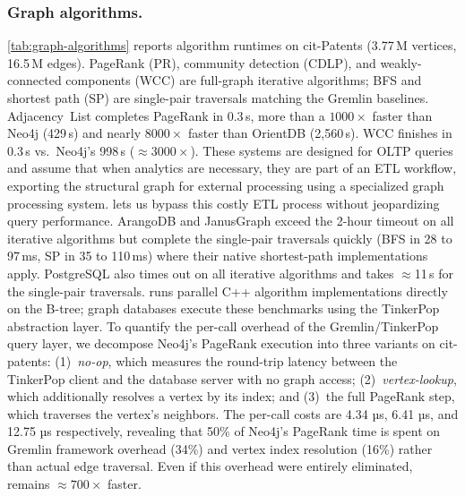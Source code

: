 \subsubsection{Graph algorithms.}
\label{sec:eval:property-graphalytics}
\autoref{tab:graph-algorithms} reports algorithm runtimes on cit-Patents (3.77\,M vertices, 16.5\,M edges).
PageRank (PR), community detection (CDLP), and weakly-connected components (WCC) are full-graph iterative algorithms; BFS and shortest path (SP) are single-pair traversals matching the Gremlin baselines.
\project{} Adjacency~List completes PageRank in 0.3\,s, more than a $1000\times$ faster than Neo4j (429\,s) and nearly $8000\times$ faster than OrientDB (2{,}560\,s).
WCC finishes in 0.3\,s vs.\ Neo4j's 998\,s ($\approx 3000\times$).
These systems are designed for OLTP queries and assume that when analytics are necessary, they are part of an ETL workflow, exporting the structural graph for external processing using a specialized graph processing system.
\project{} lets us bypass this costly ETL process without jeopardizing query performance.
ArangoDB and JanusGraph exceed the 2-hour timeout on all iterative algorithms but complete the single-pair traversals quickly (BFS in 28 to 97\,ms, SP in 35 to 110\,ms) where their native shortest-path implementations apply.
PostgreSQL also times out on all iterative algorithms and takes $\approx$11\,s for the single-pair traversals.
\project{} runs parallel C++ algorithm implementations directly on the \wt{} B-tree; graph databases execute these benchmarks using the TinkerPop abstraction layer. %
To quantify the per-call overhead of the Gremlin/TinkerPop query layer, we decompose Neo4j's PageRank execution into three variants on cit-patents:
(1)~\emph{no-op}, which measures the round-trip latency between the TinkerPop client and the database server with no graph access;
(2)~\emph{vertex-lookup}, which additionally resolves a vertex by its index; and
(3)~the full PageRank step, which traverses the vertex's neighbors.
The per-call costs are 4.34 µs, 6.41 µs, and 12.75 µs respectively, revealing that 50\% of Neo4j's PageRank time is spent on Gremlin framework overhead (34\%) and vertex index resolution (16\%) rather than actual edge traversal.
Even if this overhead were entirely eliminated, \project{} remains $\approx700\times$ faster.

